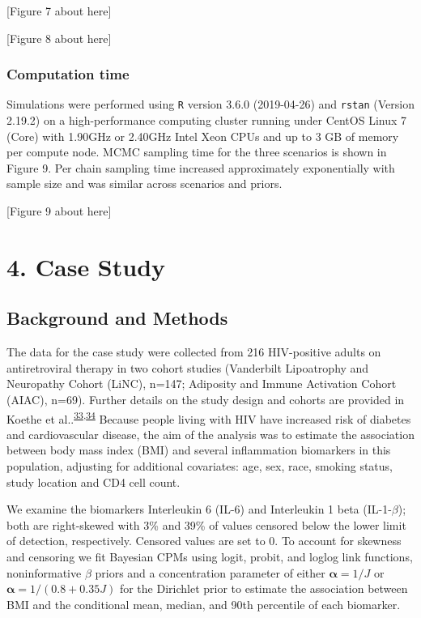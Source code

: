 \documentclass[
]{article}
\begin{document}
{[}Figure 7 about here{]}

{[}Figure 8 about here{]}

\hypertarget{computation-time}{%
\subsubsection{Computation time}\label{computation-time}}

Simulations were performed using \texttt{R} version 3.6.0 (2019-04-26) and \texttt{rstan} (Version 2.19.2) on a high-performance computing cluster running under CentOS Linux 7 (Core) with 1.90GHz or 2.40GHz Intel Xeon CPUs and up to 3 GB of memory per compute node. MCMC sampling time for the three scenarios is shown in Figure 9. Per chain sampling time increased approximately exponentially with sample size and was similar across scenarios and priors.

{[}Figure 9 about here{]}

\hypertarget{case-study}{%
\section{4. Case Study}\label{case-study}}

\hypertarget{background-and-methods}{%
\subsection{Background and Methods}\label{background-and-methods}}

The data for the case study were collected from 216 HIV-positive adults on antiretroviral therapy in two cohort studies (Vanderbilt Lipoatrophy and Neuropathy Cohort (LiNC), n=147; Adiposity and Immune Activation Cohort (AIAC), n=69). Further details on the study design and cohorts are provided in Koethe et al..\textsuperscript{\protect\hyperlink{ref-koethe_serum_2012}{33},\protect\hyperlink{ref-koethe_metabolic_2015}{34}} Because people living with HIV have increased risk of diabetes and cardiovascular disease, the aim of the analysis was to estimate the association between body mass index (BMI) and several inflammation biomarkers in this population, adjusting for additional covariates: age, sex, race, smoking status, study location and CD4 cell count.

We examine the biomarkers Interleukin 6 (IL-6) and Interleukin 1 beta (IL-1-\(\beta\)); both are right-skewed with 3\% and 39\% of values censored below the lower limit of detection, respectively. Censored values are set to 0. To account for skewness and censoring we fit Bayesian CPMs using logit, probit, and loglog link functions, noninformative \(\beta\) priors and a concentration parameter of either \(\boldsymbol{\alpha}=1/J\) or \(\boldsymbol{\alpha}=1/(0.8+0.35J)\) for the Dirichlet prior to estimate the association between BMI and the conditional mean, median, and 90th percentile of each biomarker.
\end{document}
